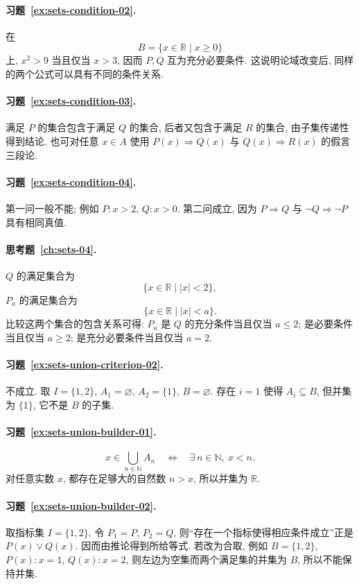 \documentclass[usesamecnt, thmcnt=section, lang=cn, newtx, 10pt, scheme=chinese]{elegantbook}
\begin{document}
\paragraph*{习题~\ref{ex:sets-condition-02}.}
在
\[
 B=\{x\in\mathbb R\mid x\geq0\}
\]
上, $x^2>9$ 当且仅当 $x>3$, 因而 $P,Q$ 互为充分必要条件. 这说明论域改变后, 同样的两个公式可以具有不同的条件关系.

\paragraph*{习题~\ref{ex:sets-condition-03}.}
满足 $P$ 的集合包含于满足 $Q$ 的集合, 后者又包含于满足 $R$ 的集合, 由子集传递性得到结论. 也可对任意 $x\in A$ 使用 $P(x)\Rightarrow Q(x)$ 与 $Q(x)\Rightarrow R(x)$ 的假言三段论.

\paragraph*{习题~\ref{ex:sets-condition-04}.}
第一问一般不能; 例如 $P:x>2$, $Q:x>0$. 第二问成立, 因为 $P\Rightarrow Q$ 与 $\neg Q\Rightarrow\neg P$ 具有相同真值.

\paragraph*{思考题~\ref{ch:sets-04}.}
$Q$ 的满足集合为
\[
 \{x\in\mathbb R\mid |x|<2\},
\]
$P_a$ 的满足集合为
\[
 \{x\in\mathbb R\mid |x|<a\}.
\]
比较这两个集合的包含关系可得: $P_a$ 是 $Q$ 的充分条件当且仅当 $a\leq2$; 是必要条件当且仅当 $a\geq2$; 是充分必要条件当且仅当 $a=2$.

\paragraph*{习题~\ref{ex:sets-union-criterion-02}.}
不成立. 取 $I=\{1,2\}$, $A_1=\varnothing$, $A_2=\{1\}$, $B=\varnothing$. 存在 $i=1$ 使得 $A_i\subseteq B$, 但并集为 $\{1\}$, 它不是 $B$ 的子集.

\paragraph*{习题~\ref{ex:sets-union-builder-01}.}
\[
 x\in\bigcup_{n\in\mathbb N}A_n
 \quad\Leftrightarrow\quad
 \exists\,n\in\mathbb N,\ x<n.
\]
对任意实数 $x$, 都存在足够大的自然数 $n>x$, 所以并集为 $\mathbb R$.

\paragraph*{习题~\ref{ex:sets-union-builder-02}.}
取指标集 $I=\{1,2\}$, 令 $P_1=P$, $P_2=Q$, 则``存在一个指标使得相应条件成立''正是 $P(x)\vee Q(x)$. 因而由推论得到所给等式. 若改为合取, 例如 $B=\{1,2\}$, $P(x):x=1$, $Q(x):x=2$, 则左边为空集而两个满足集的并集为 $B$, 所以不能保持并集.
\end{document}
